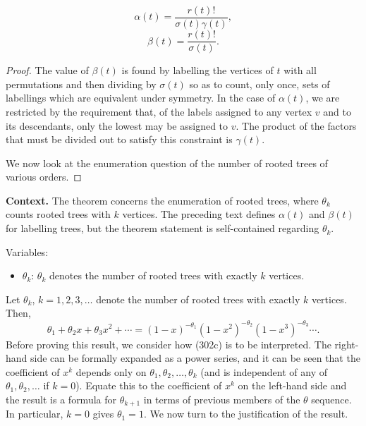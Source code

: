 \begin{theorem}

  \label{thm:302A}
\[
\alpha(t) = \frac{r(t)!}{\sigma(t)\gamma(t)}, \tag{302a}
\]
\[
\beta(t) = \frac{r(t)!}{\sigma(t)}. \tag{302b}
\]
\end{theorem}

\begin{proof}
The value of $\beta(t)$ is found by labelling the vertices of $t$ with all permutations and then dividing by $\sigma(t)$ so as to count, only once, sets of labellings which are equivalent under symmetry. In the case of $\alpha(t)$, we are restricted by the requirement that, of the labels assigned to any vertex $v$ and to its descendants, only the lowest may be assigned to $v$. The product of the factors that must be divided out to satisfy this constraint is $\gamma(t)$.

We now look at the enumeration question of the number of rooted trees of various orders.
\end{proof}

\noindent\textbf{Context.}
The theorem concerns the enumeration of rooted trees, where $\theta_k$ counts rooted trees with $k$ vertices. The preceding text defines $\alpha(t)$ and $\beta(t)$ for labelling trees, but the theorem statement is self-contained regarding $\theta_k$.

Variables:
\begin{itemize}
    \item $\theta_k$: $\theta_k$ denotes the number of rooted trees with exactly $k$ vertices.
\end{itemize}

\begin{theorem}

  \label{thm:302B}
Let $\theta_k$, $k = 1, 2, 3, \dots$ denote the number of rooted trees with exactly $k$ vertices. Then,
\[
\theta_1 + \theta_2 x + \theta_3 x^2 + \cdots = (1 - x)^{-\theta_1} (1 - x^2)^{-\theta_2} (1 - x^3)^{-\theta_3} \cdots. \tag{302c}
\]
Before proving this result, we consider how (302c) is to be interpreted. The right-hand side can be formally expanded as a power series, and it can be seen that the coefficient of $x^k$ depends only on $\theta_1, \theta_2, \dots, \theta_k$ (and is independent of any of $\theta_1, \theta_2, \dots$ if $k = 0$). Equate this to the coefficient of $x^k$ on the left-hand side and the result is a formula for $\theta_{k+1}$ in terms of previous members of the $\theta$ sequence. In particular, $k = 0$ gives $\theta_1 = 1$. We now turn to the justification of the result.
\end{theorem}

